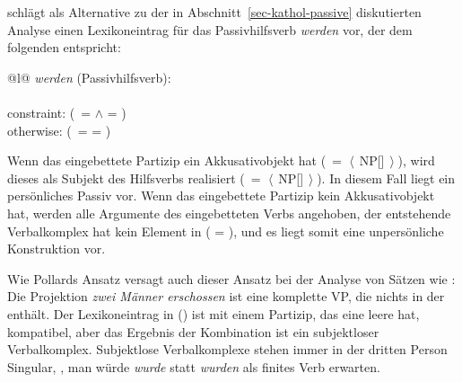 {\citet[]{Kathol94a} schlägt als Alternative zu der in Abschnitt~\ref{sec-kathol-passive} diskutierten Analyse einen Lexikoneintrag für
das Passivhilfsverb \emph{werden} vor, der dem folgenden entspricht:

\ea
\begin{tabular}[t]{@{}l@{}}
\emph{werden} (Passivhilfsverb):\\
\\
constraint: (\, =  $\wedge$  = )\\[2mm]
otherwise: (\, =  = \eliste)
\end{tabular}
\z
Wenn das eingebettete Partizip ein Akkusativobjekt hat 
(\, = $\left\langle\right.$\,NP[]\,$\left.\right\rangle$), 
wird dieses als Subjekt des Hilfsverbs realisiert
(\, = $\left\langle\right.$\,NP[]\,$\left.\right\rangle$).
In diesem Fall liegt ein persönliches Passiv vor. Wenn das eingebettete Partizip kein Akkusativobjekt hat,
werden alle Argumente des eingebetteten Verbs  angehoben, der entstehende Verbalkomplex
hat kein Element in \subj ( = \eliste), und es liegt somit eine unpersönliche Konstruktion vor.

Wie Pollards Ansatz versagt auch dieser Ansatz bei der Analyse von Sätzen
wie : Die Projektion \emph{zwei Männer
erschossen} ist eine komplette VP, die nichts in der \compsl enthält.
Der Lexikoneintrag in () ist mit einem Partizip, das eine leere \compsl hat, kompatibel,
aber das Ergebnis der Kombination ist ein subjektloser Verbalkomplex.
Subjektlose Verbalkomplexe stehen immer in der dritten Person Singular, 
\dash, man würde \emph{wurde} statt \emph{wurden} als finites Verb erwarten.

%
%



}
